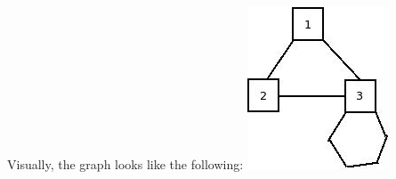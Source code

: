 \documentclass[11pt]{book}
\begin{document}
Visually, the graph looks like the following:
\includegraphics[width=.9\linewidth]{./pic/clonegraph.jpg}
\end{document}
